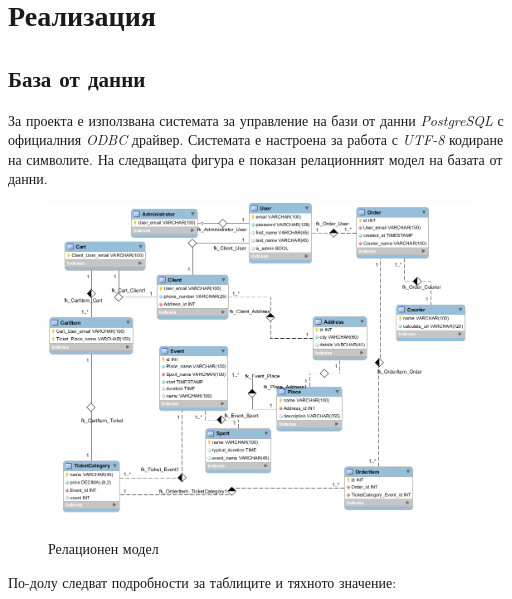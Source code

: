 \documentclass[a4paper,10pt, leqno]{article}
\newcommand{\term}[1] {\textsl{#1}}
\begin{document}
\section{Реализация}
\subsection{База от данни}
За проекта е използвана системата за управление на бази от данни \term{PostgreSQL} с официалния \term{ODBC} драйвер.
Системата е настроена за работа с \term{UTF-8} кодиране на символите. На следващата фигура е показан релационният
модел на базата от данни.

\begin{figure}
    \centering
    \includegraphics[width=15cm]{../database/relational_model.png}
    \label{fig:r}
    \caption{Релационен модел}
\end{figure}

По-долу следват подробности за таблиците и тяхното значение:
\end{document}
